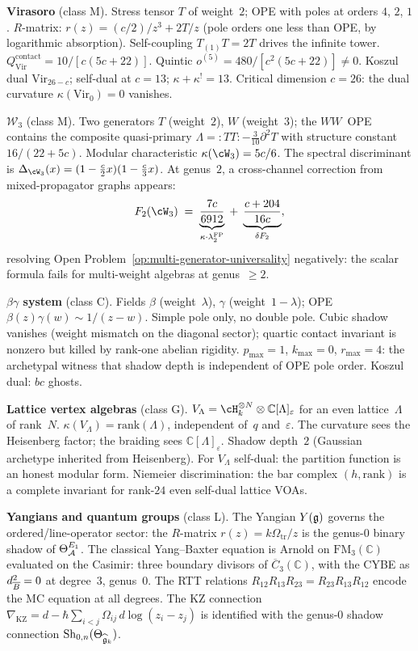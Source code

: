 \medskip
\noindent\textbf{Virasoro} (class M).
Stress tensor $T$ of weight~$2$; OPE with poles at orders
$4$, $2$, $1$. $R$-matrix:
$r(z)=(c/2)/z^3+2T/z$ (pole orders one less than OPE, by
logarithmic absorption). Self-coupling $T_{(1)}T=2T$ drives
the infinite tower. $Q^{\mathrm{contact}}_{\mathrm{Vir}}
=10/[c(5c{+}22)]$. Quintic
$o^{(5)}=480/[c^2(5c{+}22)]\neq 0$. Koszul dual
$\mathrm{Vir}_{26-c}$; self-dual at $c=13$;
$\kappa+\kappa^!=13$. Critical dimension $c=26$: the dual
curvature $\kappa(\mathrm{Vir}_0)=0$ vanishes.

\medskip
\noindent\textbf{$\mathcal W_3$} (class M).
Two generators $T$ (weight~$2$), $W$ (weight~$3$); the
$WW$~OPE contains the composite quasi-primary
$\Lambda={:}TT{:}-\tfrac{3}{10}\partial^2 T$ with
structure constant $16/(22{+}5c)$. Modular characteristic
$\kappa(\cW_3)=5c/6$. The spectral discriminant is
$\Delta_{\cW_3}(x)=(1-\frac{c}{2}x)(1-\frac{c}{3}x)$.
At genus~$2$, a cross-channel correction from
mixed-propagator graphs appears:
\[
F_2(\cW_3)
\;=\;
\underbrace{\frac{7c}{6912}}_{\kappa\cdot\lambda_2^{\mathrm{FP}}}
\;+\;
\underbrace{\frac{c+204}{16c}}_{\delta F_2},
\]
resolving Open Problem~\ref{op:multi-generator-universality}
negatively: the scalar formula fails for multi-weight algebras
at genus~$\ge 2$.

\medskip
\noindent\textbf{$\beta\gamma$ system} (class C).
Fields $\beta$ (weight~$\lambda$), $\gamma$
(weight~$1{-}\lambda$); OPE
$\beta(z)\gamma(w)\sim 1/(z{-}w)$. Simple pole only, no
double pole. Cubic shadow vanishes (weight mismatch on the
diagonal sector); quartic contact invariant is nonzero but
killed by rank-one abelian rigidity.
$p_{\max}=1$, $k_{\max}=0$, $r_{\max}=4$: the archetypal
witness that shadow depth is independent of OPE pole order.
Koszul dual: $bc$ ghosts.

\medskip
\noindent\textbf{Lattice vertex algebras} (class G).
$V_\Lambda = \cH_k^{\otimes N}\otimes\mathbb C[\Lambda]_\varepsilon$
for an even lattice~$\Lambda$ of rank~$N$.
$\kappa(V_\Lambda)=\mathrm{rank}(\Lambda)$, independent
of~$q$ and~$\varepsilon$. The curvature sees the Heisenberg
factor; the braiding sees $\mathbb C[\Lambda]_\varepsilon$.
Shadow depth~$2$ (Gaussian archetype inherited from
Heisenberg). For $V_\Lambda$ self-dual: the partition function
is an honest modular form. Niemeier discrimination: the bar
complex $(h,\mathrm{rank})$ is a complete invariant for rank-$24$
even self-dual lattice VOAs.

\medskip
\noindent\textbf{Yangians and quantum groups} (class L).
The Yangian $Y(\mathfrak{g})$ governs the ordered/line-operator sector:
the $R$-matrix $r(z)=k\Omega_{\mathrm{tr}}/z$ is the genus-$0$ binary shadow
of $\Theta^{E_1}_{\mathcal{A}}$. The classical Yang--Baxter equation is
Arnold on $\mathrm{FM}_3(\mathbb C)$ evaluated on the Casimir:
three boundary divisors of $\overline C_3(\mathbb C)$, with the
CYBE as $d_{\overline{B}}^2=0$ at degree~$3$, genus~$0$. The RTT
relations $R_{12}R_{13}R_{23}=R_{23}R_{13}R_{12}$ encode the MC
equation at all degrees. The KZ connection
$\nabla_{\mathrm{KZ}}
=d-\hbar\sum_{i<j}\Omega_{ij}\,d\log(z_i{-}z_j)$
is identified with the genus-$0$ shadow connection
$\mathrm{Sh}_{0,n}(\Theta_{\widehat{\mathfrak{g}}_k})$.


